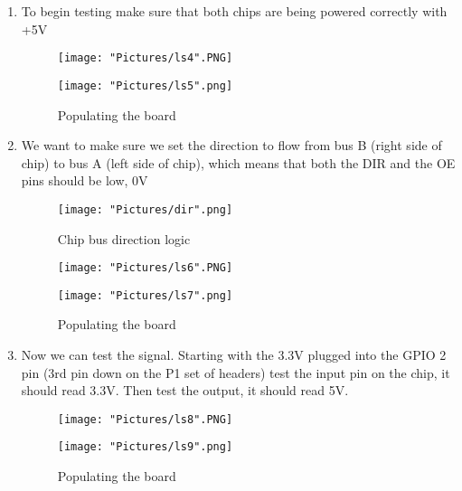 \documentclass[12pt]{article}
\begin{document}
\begin{enumerate}
	\item To begin testing make sure that both chips are being powered correctly with +5V
	
\begin{figure}[H]
 	\centering
  	\begin{minipage}[b]{0.45\textwidth}
		\texttt{[image: "Pictures/ls4".PNG]}
  	\end{minipage}
  	\hfill
  	\begin{minipage}[b]{0.45\textwidth}
    		\texttt{[image: "Pictures/ls5".png]}
  	\end{minipage}
	\caption{Populating the board}
	\label{ls2}
\end{figure}

	\item We want to make sure we set the direction to flow from bus B (right side of chip) to bus A (left side of chip), which means that both the DIR and the OE pins should be low, 0V

\begin{figure}[H]
  	\centering
    	\texttt{[image: "Pictures/dir".png]}
 	\caption{Chip bus direction logic}
	\label{dir}
\end{figure}

\begin{figure}[H]
 	\centering
  	\begin{minipage}[b]{0.45\textwidth}
		\texttt{[image: "Pictures/ls6".PNG]}
  	\end{minipage}
  	\hfill
  	\begin{minipage}[b]{0.45\textwidth}
    		\texttt{[image: "Pictures/ls7".png]}
  	\end{minipage}
	\caption{Populating the board}
	\label{ls2}
\end{figure}

	\item Now we can test the signal. Starting with the 3.3V plugged into the GPIO 2 pin (3rd pin down on the P1 set of headers) test the input pin on the chip, it should read 3.3V. Then test the output, it should read 5V.

\begin{figure}[H]
 	\centering
  	\begin{minipage}[b]{0.45\textwidth}
		\texttt{[image: "Pictures/ls8".PNG]}
  	\end{minipage}
  	\hfill
  	\begin{minipage}[b]{0.45\textwidth}
    		\texttt{[image: "Pictures/ls9".png]}
  	\end{minipage}
	\caption{Populating the board}
	\label{ls2}
\end{figure}


\end{enumerate}
\end{document}
